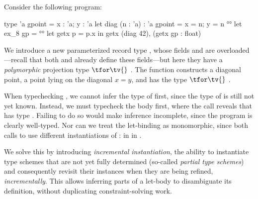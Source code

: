 \documentclass[acmsmall,screen,nonacm%
\Anonymous{,anonymous}{}%
\Final{}{,review}%
]{acmart}
\providecommand{\DIFadd}[1]{\protect\cbstart{\protect\color{blue}#1}\protect\cbend} %
\providecommand{\DIFdel}[1]{\protect\cbdelete{\protect\color{red}#1}\protect\cbdelete} %
\providecommand{\DIFaddbegin}{} %
\providecommand{\DIFaddend}{} %
\providecommand{\DIFdelbegin}{} %
\providecommand{\DIFdelend}{} %
\begin{document}

Consider the following program:
\DIFdelbegin %
\DIFdelend \DIFaddbegin \begin{program}[input]
type 'a gpoint = { x : 'a; y : 'a }                     
let diag (n : 'a) : 'a gpoint = { x = n; y = n }
°\halfline°
let ex_8 gp =                                           °°
  let getx p = p.x in getx (diag 42), (getx gp : float)
\end{program}
\DIFaddend We introduce a new parameterized record type , whose
fields  and  are overloaded---recall that both  and
 already define these fields---but here they have a
\emph{polymorphic} projection type $\tfor \tv {}$ . The
function  constructs a diagonal point, a point lying on the
diagonal $x = y$, and has the type $\tfor \tv {}$ .

When typechecking , we cannot infer the type of  first,
since the type of  is still not yet known. Instead, we must typecheck
the body first, where the call  reveals that  has
type .
%
Failing to do so would make inference incomplete, since the program is
clearly well-typed. Nor can we treat the let-binding as monomorphic, since
both calls to  use different instantiations of : \DIFdelbegin \DIFdel{$\tv \is \tint$ }\DIFdelend \DIFaddbegin \DIFadd{indeed,
$\tv$ is $\tint$ }\DIFaddend in  \DIFdelbegin \DIFdel{and $\tv \is \tfloat$ }\DIFdelend \DIFaddbegin \DIFadd{while $\tv$ is $\tfloat$ }\DIFaddend in
.


We solve this by introducing \emph{incremental instantiation}, \ie the ability
to instantiate type schemes that are not yet fully determined (so-called
\emph{partial type schemes}) and consequently revisit their instances when they
are being refined, \emph{incrementally}. This allows inferring parts of a
let-body to disambiguate its definition, without duplicating
constraint-solving work.
\end{document}
